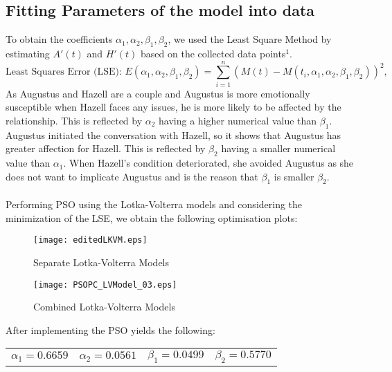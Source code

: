 \documentclass{article}
\newcommand*\circled[1]{\tikz[baseline=(char.base)]{
            \node[shape=circle,draw,inner sep=2pt] (char) {#1};}}
\begin{document}
\subsection*{\circled{3.3} Fitting Parameters of the model into data}
To obtain the coefficients $\alpha_1, \alpha_2, \beta_1, \beta_2$, we used the Least Square Method by estimating  $A'(t)$ and  $H'(t)$ based on the collected data points\hyperlink{AppendixA}{$^1$}.\\
\begin{equation*}
    \text{Least Squares Error (LSE): } E(\alpha_1,\alpha_2,\beta_1,\beta_2)=\sum_{i=1}^{n}(M(t)-M(t_i,\alpha_1, \alpha_2,\beta_1,\beta_2))^2 , 
\end{equation*}
\newline
\noindent
As Augustus and Hazell are a couple and Augustus is more emotionally susceptible when Hazell faces any issues, he is more likely to be affected by the relationship. This is reflected by $\alpha_2$ having a higher numerical value than $\beta_1$.
Augustus initiated the conversation with Hazell, so it shows that Augustus has greater affection for Hazell. This is reflected by $\beta_2$ having a smaller numerical value than $\alpha_1$. When Hazell's condition deteriorated, she avoided Augustus as she does not want to implicate Augustus and  is the reason that $\beta_1$ is smaller $\beta_2$.\\ \\
Performing PSO using the Lotka-Volterra models and considering the minimization of the LSE, we obtain the following optimisation plots: \newline
\newline
\begin{minipage}{0.48\textwidth}
\begin{figure}[H]
	\centering
	\texttt{[image: editedLKVM.eps]}
	\caption{Separate Lotka-Volterra Models}
	\label{fig:LKVM}\vspace{0.4cm}
\end{figure}
\end{minipage}
\hfill \vline \hfill
\begin{minipage}{0.48\textwidth}
\begin{figure}[H]
	\centering
	\texttt{[image: PSOPC\_LVModel\_03.eps]}
	\caption{Combined Lotka-Volterra Models}
	\label{fig:LKVMcomb}
	\vspace{0.4cm}
\end{figure}
\end{minipage}
\newline
\leavevmode
\newline
\newline
After implementing the PSO yields the following:
\begin{center}
\begin{tabular}{c c c c}
    $\alpha_1 = 0.6659$ & $\alpha_2 = 0.0561$ & $\beta_1 = 0.0499$ & $\beta_2 = 0.5770$\\
\end{tabular}
\end{center}
\end{document}
